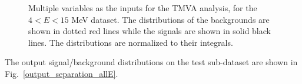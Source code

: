 \begin{figure}[htbp]
{\begin{minipage}[b]{0.4\textwidth}
		\end{minipage}
	}	
	\caption[Multiple variables as the inputs for the TMVA analysis.]{Multiple variables as the inputs for the TMVA analysis, for the $4<E<15$ MeV dataset. The distributions of the backgrounds are shown in dotted red lines while the signals are shown in solid black lines. The distributions are normalized to their integrals.\label{fig:inputParamsTMVA}}
\end{figure}

The output signal/background distributions on the test sub-dataset are shown in Fig.~\ref{output_separation_allE}.
